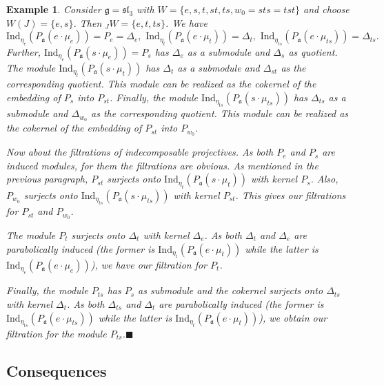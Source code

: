 \documentclass[a4paper]{amsart}
\newtheorem{example}[theorem]{Example}
\begin{document}
\begin{example}
{\rm Consider $\mathfrak{g}=\mathfrak{sl}_3$
with $W=\{e,s,t,st,ts,w_0=sts=tst\}$ and choose
$W(J)=\{e,s\}$. Then ${}_JW=\{e,t,ts\}$. We have
\begin{displaymath}
\mathrm{Ind}_{\eta_e}(P_\mathfrak{a}(e\cdot \mu_e))=P_e=\Delta_e,\,\, 
\mathrm{Ind}_{\eta_t}(P_\mathfrak{a}(e\cdot \mu_t))=\Delta_t,\, \,
\mathrm{Ind}_{\eta_{ts}}(P_\mathfrak{a}(e\cdot \mu_{ts}))=\Delta_{ts}.
\end{displaymath}
Further,  $\mathrm{Ind}_{\eta_e}(P_\mathfrak{a}(s\cdot \mu_e))=P_s$
has $\Delta_e$ as a submodule and $\Delta_s$ as quotient.
The module $\mathrm{Ind}_{\eta_t}(P_\mathfrak{a}(s\cdot \mu_t))$
has $\Delta_t$ as a submodule and $\Delta_{st}$ as the corresponding quotient.
This module can be realized as the cokernel of the embedding of
$P_s$ into $P_{st}$. Finally, the module 
$\mathrm{Ind}_{\eta_{ts}}(P_\mathfrak{a}(s\cdot \mu_{ts}))$
has $\Delta_{ts}$ as a submodule and $\Delta_{w_0}$ as the corresponding
quotient. This module can be realized as the cokernel of the embedding of
$P_{st}$ into $P_{w_0}$.

Now about the filtrations of indecomposable projectives. 
As both $P_e$ and $P_s$ are induced modules, for them the filtrations
are obvious. As mentioned in the previous paragraph, 
$P_{st}$ surjects onto $\mathrm{Ind}_{\eta_t}(P_\mathfrak{a}(s\cdot \mu_t))$
with kernel $P_s$. Also, 
$P_{w_0}$ surjects onto 
$\mathrm{Ind}_{\eta_{ts}}(P_\mathfrak{a}(s\cdot \mu_{ts}))$
with kernel $P_{st}$. This gives our filtrations for
$P_{st}$ and $P_{w_0}$.

The module $P_t$ surjects onto $\Delta_t$ with kernel
$\Delta_e$. As both  $\Delta_t$ and $\Delta_e$ are parabolically induced
(the former is $\mathrm{Ind}_{\eta_t}(P_\mathfrak{a}(e\cdot \mu_t))$
while the latter is $\mathrm{Ind}_{\eta_e}(P_\mathfrak{a}(e\cdot \mu_e))$),
we have our filtration for $P_t$.

Finally, the module $P_{ts}$ has $P_s$ as submodule and the cokernel
surjects onto $\Delta_{ts}$ with kernel
$\Delta_t$. As both  $\Delta_{ts}$ and $\Delta_t$ are parabolically induced
(the former is $\mathrm{Ind}_{\eta_{ts}}(P_\mathfrak{a}(e\cdot \mu_{ts}))$
while the latter is $\mathrm{Ind}_{\eta_t}(P_\mathfrak{a}(e\cdot \mu_t))$),
we obtain our filtration for the module $P_{ts}$.\hfill$\blacksquare$
}
\end{example}


\subsection{Consequences}\label{s3.3}
\end{document}
